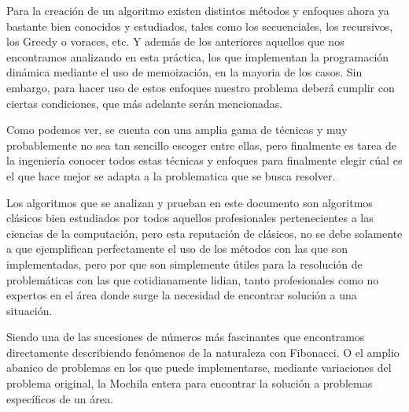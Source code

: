 Para la creación de un algoritmo existen distintos métodos y enfoques ahora ya bastante bien conocidos y estudiados, tales como los secuenciales, los recursivos, los Greedy o voraces, etc. Y además de los anteriores aquellos que nos encontramos analizando en esta práctica, los que implementan la programación dinámica mediante el uso de memoización, en la mayoria de los casos. Sin embargo, para hacer uso de estos enfoques nuestro problema deberá cumplir con ciertas condiciones, que más adelante serán mencionadas.

Como podemos ver, se cuenta con una amplia gama de técnicas y muy probablemente no sea tan sencillo escoger entre ellas, pero finalmente es tarea de la ingeniería conocer todos estas técnicas y enfoques para finalmente elegir cúal es el que hace mejor se adapta a la problematica que se busca resolver.

Los algoritmos que se analizan y prueban en este documento son algoritmos clásicos bien estudiados por todos aquellos profesionales pertenecientes a las ciencias de la computación, pero esta reputación de clásicos, no se debe solamente a que ejemplifican perfectamente el uso de los métodos con las que son implementadas, pero por que son simplemente útiles para la resolución de problemáticas con las que cotidianamente lidian, tanto profesionales como no expertos en el área donde surge la necesidad de encontrar solución a una situación.

Siendo una de las sucesiones de números más fascinantes que encontramos directamente describiendo fenómenos de la naturaleza con Fibonacci. O el amplio abanico de problemas en los que puede implementarse, mediante variaciones del problema original, la Mochila entera para encontrar la solución a problemas específicos de un área.